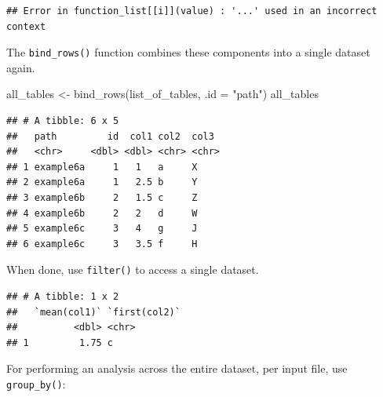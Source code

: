 \documentclass[]{book}
\newenvironment{Shaded}{}{}
\newcommand{\DataTypeTok}[1]{#1}
\newcommand{\KeywordTok}[1]{\textcolor[rgb]{0.00,0.00,1.00}{#1}}
\newcommand{\NormalTok}[1]{#1}
\newcommand{\OperatorTok}[1]{#1}
\newcommand{\StringTok}[1]{\textcolor[rgb]{0.00,0.50,0.50}{#1}}
\begin{document}
\begin{verbatim}
## Error in function_list[[i]](value) : '...' used in an incorrect context
\end{verbatim}

The \texttt{bind\_rows()} function combines these components into a single dataset again.

\begin{Shaded}
\begin{Highlighting}[]
\NormalTok{all_tables <-}\StringTok{ }\KeywordTok{bind_rows}\NormalTok{(list_of_tables, }\DataTypeTok{.id =} \StringTok{"path"}\NormalTok{)}
\NormalTok{all_tables}
\end{Highlighting}
\end{Shaded}

\begin{verbatim}
## # A tibble: 6 x 5
##   path         id  col1 col2  col3 
##   <chr>     <dbl> <dbl> <chr> <chr>
## 1 example6a     1   1   a     X    
## 2 example6a     1   2.5 b     Y    
## 3 example6b     2   1.5 c     Z    
## 4 example6b     2   2   d     W    
## 5 example6c     3   4   g     J    
## 6 example6c     3   3.5 f     H
\end{verbatim}

When done, use \texttt{filter()} to access a single dataset.

\begin{Shaded}
\end{Shaded}

\begin{verbatim}
## # A tibble: 1 x 2
##   `mean(col1)` `first(col2)`
##          <dbl> <chr>        
## 1         1.75 c
\end{verbatim}

For performing an analysis across the entire dataset, per input file, use \texttt{group\_by()}:

\begin{Shaded}
\end{Shaded}
\end{document}
